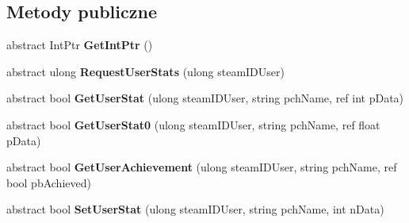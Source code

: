 \subsection*{Metody publiczne}
\begin{DoxyCompactItemize}
\item 
\mbox{\label{class_valve_1_1_steamworks_1_1_i_steam_game_server_stats_a4cbb9c913f56e8449c59e80dcb090d2b}} 
abstract Int\+Ptr {\bfseries Get\+Int\+Ptr} ()
\item 
\mbox{\label{class_valve_1_1_steamworks_1_1_i_steam_game_server_stats_a89921e659af3879f57e07a63cdc0f2c3}} 
abstract ulong {\bfseries Request\+User\+Stats} (ulong steam\+I\+D\+User)
\item 
\mbox{\label{class_valve_1_1_steamworks_1_1_i_steam_game_server_stats_a33c5368b148ec94290baf050aa26442d}} 
abstract bool {\bfseries Get\+User\+Stat} (ulong steam\+I\+D\+User, string pch\+Name, ref int p\+Data)
\item 
\mbox{\label{class_valve_1_1_steamworks_1_1_i_steam_game_server_stats_ae33932aa031968860d0c4df2be4b0278}} 
abstract bool {\bfseries Get\+User\+Stat0} (ulong steam\+I\+D\+User, string pch\+Name, ref float p\+Data)
\item 
\mbox{\label{class_valve_1_1_steamworks_1_1_i_steam_game_server_stats_adc8b50182577f70cd1a47408986666f9}} 
abstract bool {\bfseries Get\+User\+Achievement} (ulong steam\+I\+D\+User, string pch\+Name, ref bool pb\+Achieved)
\item 
\mbox{\label{class_valve_1_1_steamworks_1_1_i_steam_game_server_stats_ab5386ea9b99f853a05378de8ca688782}} 
abstract bool {\bfseries Set\+User\+Stat} (ulong steam\+I\+D\+User, string pch\+Name, int n\+Data)
\item 
\mbox{\label{class_valve_1_1_steamworks_1_1_i_steam_game_server_stats_a04e9d681c3a498dbee9da66c103e2c71}} 

\end{DoxyCompactItemize}
